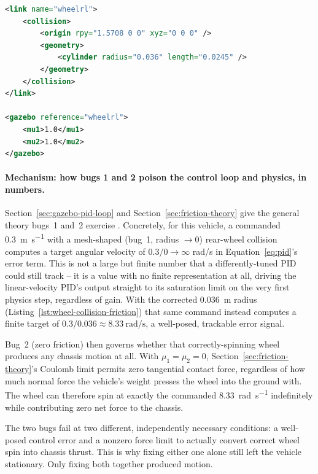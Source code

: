 \begin{lstlisting}[language=XML,caption={Wheel collision cylinder and friction (\texttt{urdf/qcar\_model.xacro}) -- fixes for bugs 1 and 2 in Table~\ref{tab:not-moving-bugs}.},label={lst:wheel-collision-friction}]
<link name="wheelrl">
    <collision>
        <origin rpy="1.5708 0 0" xyz="0 0 0" />
        <geometry>
            <cylinder radius="0.036" length="0.0245" />
        </geometry>
    </collision>
</link>

<gazebo reference="wheelrl">
    <mu1>1.0</mu1>
    <mu2>1.0</mu2>
</gazebo>
\end{lstlisting}

\paragraph{Mechanism: how bugs 1 and 2 poison the control loop and physics, in numbers.}
Section~\ref{sec:gazebo-pid-loop} and Section~\ref{sec:friction-theory}
give the general theory bugs~1 and~2 exercise
\cite{astrom2008feedback}. Concretely, for this
vehicle, a commanded \SI{0.3}{\meter\per\second} with a mesh-shaped
(bug~1, radius $\to 0$) rear-wheel collision computes a target
angular velocity of $0.3 / 0 \to \infty$ rad/s in
Equation~\ref{eq:pid}'s error term. This is not a large but finite
number that a differently-tuned PID could still track -- it is a
value with no finite representation at all, driving the
linear-velocity PID's output straight to its saturation limit on the
very first physics step, regardless of gain. With the corrected
\SI{0.036}{\meter} radius (Listing~\ref{lst:wheel-collision-friction})
that same command instead computes a finite target of
$0.3 / 0.036 \approx \SI{8.33}{\radian\per\second}$, a well-posed,
trackable error signal.

Bug~2 (zero friction) then governs whether that correctly-spinning
wheel produces any chassis motion at all. With $\mu_1 = \mu_2 = 0$,
Section~\ref{sec:friction-theory}'s Coulomb limit permits zero
tangential contact force, regardless of how much normal force the
vehicle's weight presses the wheel into the ground with. The wheel
can therefore spin at exactly the commanded
\SI{8.33}{\radian\per\second} indefinitely while contributing zero
net force to the chassis.

The two bugs fail at two different, independently necessary
conditions: a well-posed control error and a nonzero force limit to
actually convert correct wheel spin into chassis thrust. This is why
fixing either one alone still left the vehicle stationary. Only
fixing both together produced motion.

